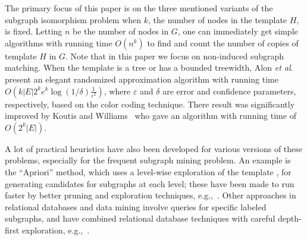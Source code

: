The primary focus of this paper is on the three mentioned variants of the
subgraph isomorphism problem when $k$, the number of nodes in the template $H$,
is fixed. Letting $n$ be the number of nodes in $G$, one can immediately get
simple algorithms with running time $O(n^k)$ to find and count the number of
copies of template $H$ in $G$. Note that in this paper we focus on non-induced
subgraph matching.
When the template is a tree or has a bounded treewidth, Alon \emph{et
al}.~\cite{alon2008biomolecular} present an elegant randomized approximation
algorithm with running time
$O(k|E|2^ke^k\log{(1/\delta)}\frac{1}{\varepsilon^2})$, where $\varepsilon$ and
$\delta$ are error and confidence parameters, respectively, based on the color
coding technique.  There result was  significantly improved by Koutis and
Williams~\cite{koutis2009limits} who gave an algorithm with running time of
$O(2^k|E|)$.

A lot of practical heuristics have also been developed for various versions of
these problems, especially for the frequent subgraph mining problem. An example
is the ``Apriori'' method, which uses a level-wise exploration of the template
\cite{inokuchi2000apriori, kuramochi2005finding}, for generating candidates for
subgraphs at each level; these have been made to run faster by better pruning
and exploration techniques, e.g.,~\cite{kuramochi2005finding, huan2004spin,
yan2005mining}. Other approaches in relational databases and data mining involve
queries for specific labeled subgraphs, and have combined relational database
techniques with careful depth-first exploration, e.g.,~\cite{sakr2009graphrel,
ronen2009evaluating, brocheler2010cosi}.

